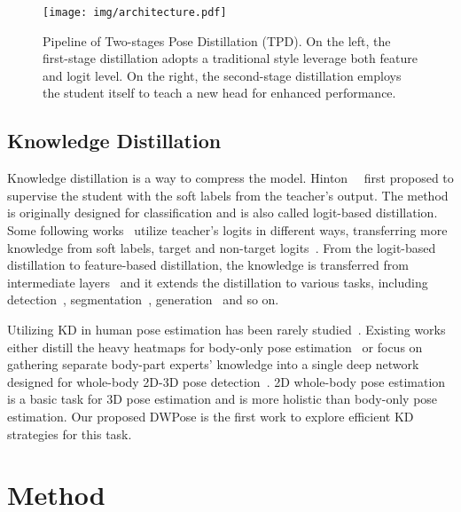 \documentclass[10pt,twocolumn,letterpaper]{article}
\begin{document}
\begin{figure*}[t]
    \centering
    \texttt{[image: img/architecture.pdf]}
    \caption{Pipeline of Two-stages Pose Distillation (TPD). On the left, the first-stage distillation adopts a traditional style leverage both feature and logit level. On the right, the second-stage distillation employs the student itself to teach a new head for enhanced performance.}
    \label{fig:architecture}
\end{figure*}

\subsection{Knowledge Distillation}

Knowledge distillation is a way to compress the model. Hinton~\etal~\cite{hinton2015distilling} first proposed to supervise the student with the soft labels from the teacher's output. The method is originally designed for classification and is also called logit-based distillation. Some following works~\cite{huang2023large,yang2020knowledge,yang2022rethinking} utilize teacher's logits in different ways, transferring more knowledge from soft labels, target and non-target logits~\cite{huang2022knowledge,yang2023knowledge,zhao2022decoupled,zhou2020rethinking,yang2023knowledge}. From the logit-based distillation to feature-based distillation, the knowledge is transferred from intermediate layers~\cite{huang2023generic,yang2022focal,yang2022vitkd} and it extends the distillation to various tasks, including detection~\cite{chen2022bevdistill, yang2022masked}, segmentation~\cite{shu2021channel}, generation~\cite{meng2023distillation} and so on.

Utilizing KD in human pose estimation has been rarely studied~\cite{Li_2021_ICCV,Nie_2019_ICCV,weinzaepfel2020dope,xu2020integral}. Existing works either distill the heavy heatmaps for body-only pose estimation~\cite{Li_2021_ICCV,Nie_2019_ICCV} or focus on gathering separate body-part experts' knowledge into a single deep network designed for whole-body 2D-3D pose detection~\cite{weinzaepfel2020dope}. 2D whole-body pose estimation is a basic task for 3D pose estimation and is more holistic than body-only pose estimation. Our proposed DWPose is the first work to explore efficient KD strategies for this task.


\section{Method}
\label{method}
\end{document}
